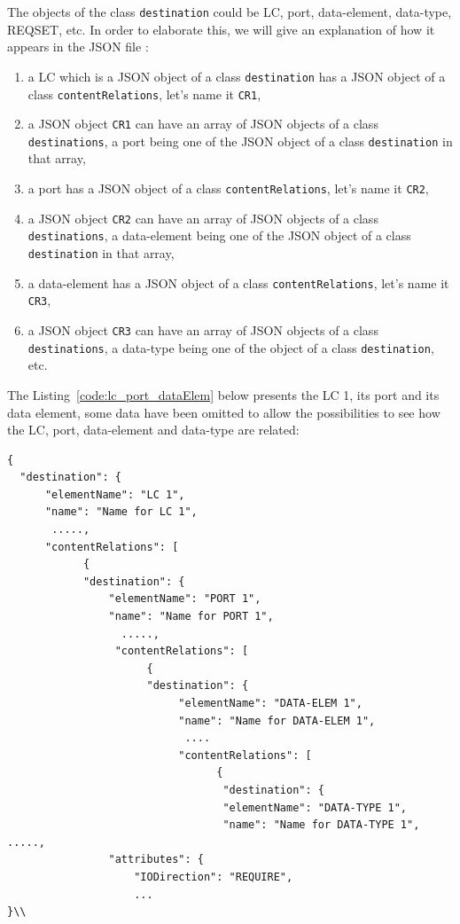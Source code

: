The objects of the class \texttt{destination} could be LC, port, data-element, data-type, REQSET, etc. In order to elaborate this, we will give an explanation of how it appears in the JSON file : \\

\begin{enumerate}
\item a LC which is a JSON object of a class \texttt{destination} has a JSON object of a class \texttt{contentRelations}, let's name it \texttt{CR1},
\item a JSON object \texttt{CR1} can have an array of JSON objects of a class \texttt{destinations}, a port being one of the JSON object of a class \texttt{destination} in that array,
\item a port has a JSON object of a class \texttt{contentRelations}, let's name it \texttt{CR2},
\item a JSON object \texttt{CR2} can have an array of JSON objects of a class \texttt{destinations}, a data-element being one of the JSON object of a class \texttt{destination} in that array,
\item a data-element has a JSON object of a class \texttt{contentRelations}, let's name it \texttt{CR3},
\item a JSON object \texttt{CR3} can have an array of JSON objects of a class \texttt{destinations}, a data-type being one of the object of a class \texttt{destination}, etc.\\
\end{enumerate} 

The Listing~\ref{code:lc_port_dataElem} below presents the LC 1, its port and its data element, some data have been omitted to allow the possibilities to see how the LC, port, data-element and data-type are related: \\

\begin{lstlisting}[caption={A sample part of a JSON file showing the relationship between LC, port and data-element},label=code:lc_port_dataElem]
{
  "destination": {
      "elementName": "LC 1", 
      "name": "Name for LC 1", 
       ....., 
      "contentRelations": [
            {
            "destination": {
                "elementName": "PORT 1", 
                "name": "Name for PORT 1", 
                  ....., 
                 "contentRelations": [
                      {
                      "destination": {
                           "elementName": "DATA-ELEM 1", 
                           "name": "Name for DATA-ELEM 1", 
                            .... 
                           "contentRelations": [
                                 {
                                  "destination": {
                                  "elementName": "DATA-TYPE 1", 
                                  "name": "Name for DATA-TYPE 1",    .....,   
                "attributes": {
                    "IODirection": "REQUIRE",
                    ...
}\\
\end{lstlisting}

